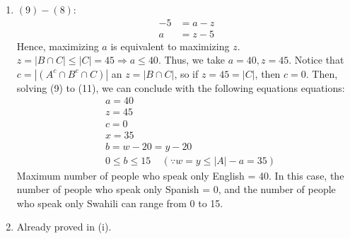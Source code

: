 \documentclass{article}
\begin{document}
\begin{enumerate}[label={(\roman*)}]
    \item 
    $(9)-(8)$:
    \begin{align}
        -5 &= a-z \nonumber\\
        a & = z-5 \nonumber
    \end{align}
    Hence, maximizing $a$ is equivalent to maximizing $z$. 
    $z=|B\cap C|\le |C|=45\Rightarrow a \le 40$.
    Thus, we take $a=40, z=45.$ 
    Notice that $c=|(A^c\cap B^c\cap C)|$ an $z=|B\cap C|$, so if $z=45=|C|$, then $c=0$.
    Then, solving (9) to (11), we can conclude with the following equations equations:
    \begin{align}
        & a = 40 \nonumber\\
        & z = 45 \nonumber\\
        & c = 0 \nonumber\\
        & x = 35 \nonumber\\
        & b = w - 20 = y - 20 \nonumber\\
        & 0 \le b \le 15 ~~~~~ (\because w = y \le |A| - a = 35) \nonumber
    \end{align}
    Maximum number of people who speak only English = 40. In this case, the number of people who speak only Spanish = 0, and the number of people who speak only Swahili can range from 0 to 15.
    \item 
    Already proved in (i). 
\end{enumerate}
\end{document}
